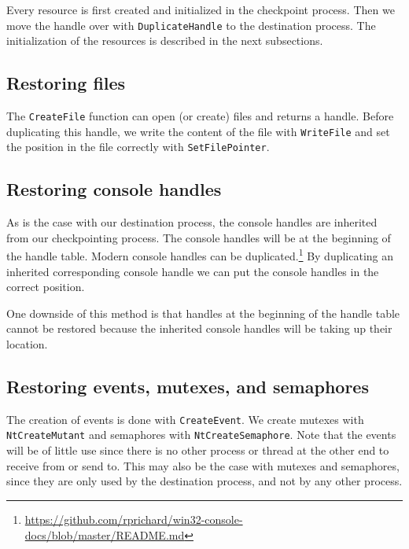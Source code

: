 \documentclass[a4paper, 11pt, english]{report}
\begin{document}
Every resource is first created and initialized in the checkpoint process. Then we move the handle over with \texttt{DuplicateHandle} to the destination process. The initialization of the resources is described in the next subsections.


\subsection{Restoring files}
\label{sec:handles-file-handles}

The \texttt{CreateFile} function can open (or create) files and returns a handle. Before duplicating this handle, we write the content of the file with \texttt{WriteFile} and set the position in the file correctly with \texttt{SetFilePointer}.

\subsection{Restoring console handles}
\label{sec:handles-console-handles}
As is the case with our destination process, the console handles are inherited from our checkpointing process. The console handles will be at the beginning of the handle table. Modern console handles can be duplicated.\footnote{\url{https://github.com/rprichard/win32-console-docs/blob/master/README.md}} By duplicating an inherited corresponding console handle we can put the console handles in the correct position.

One downside of this method is that handles at the beginning of the handle table cannot be restored because the inherited console handles will be taking up their location.

\subsection{Restoring events, mutexes, and semaphores}
\label{sec:handles-other-handles}

The creation of events is done with \texttt{CreateEvent}. We create mutexes with \texttt{NtCreateMutant} and semaphores with \texttt{NtCreateSemaphore}.
Note that the events will be of little use since there is no other process or thread at the other end to receive from or send to. This may also be the case with mutexes and semaphores, since they are only used by the destination process, and not by any other process. 
\end{document}
